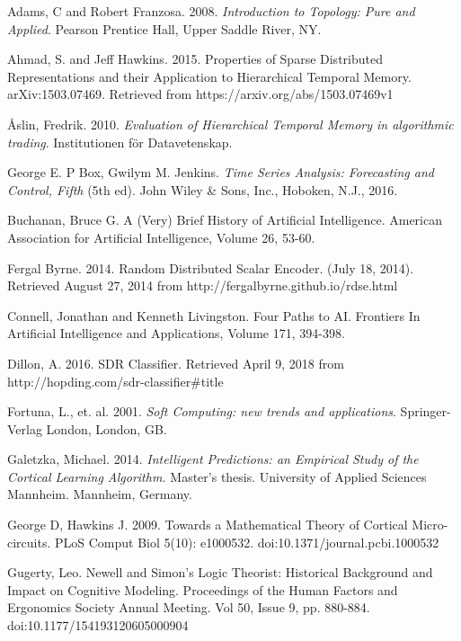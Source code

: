 \documentclass[fleqn,notitlepage,minimal]{article}
\begin{document}
	\begin{thebibliography}{99}
		
		 Adams, C and Robert Franzosa. 2008. \textit{Introduction to Topology: Pure and Applied}. Pearson Prentice Hall, Upper Saddle River, NY.
		
		 Ahmad, S. and Jeff Hawkins. 2015. Properties of Sparse Distributed Representations and their Application to Hierarchical Temporal Memory. arXiv:1503.07469. Retrieved from https://arxiv.org/abs/1503.07469v1
		
		 \r{A}slin, Fredrik. 2010. \textit{Evaluation of Hierarchical Temporal Memory in algorithmic trading}. Institutionen f\"{o}r Datavetenskap.
		
		 George E. P Box, Gwilym M. Jenkins. \emph{Time Series Analysis: Forecasting and Control, Fifth} (5th ed). John Wiley \& Sons, Inc., Hoboken, N.J., 2016.
		
		 Buchanan, Bruce G. A (Very) Brief History of Artificial Intelligence. American Association for Artificial Intelligence, Volume 26, 53-60.
		
		 Fergal Byrne. 2014. Random Distributed Scalar Encoder. (July 18, 2014). Retrieved August 27, 2014 from http://fergalbyrne.github.io/rdse.html
		
		 Connell, Jonathan and Kenneth Livingston. Four Paths to AI. Frontiers In Artificial Intelligence and Applications, Volume 171, 394-398.
		
		 Dillon, A. 2016. SDR Classifier. Retrieved April 9, 2018 from http://hopding.com/sdr-classifier\#title
		
		 Fortuna, L., et. al. 2001. \textit{Soft Computing: new trends and applications}. Springer-Verlag London, London, GB.
		
		 Galetzka, Michael. 2014. \emph{Intelligent Predictions: an Empirical Study of the Cortical Learning Algorithm.} Master's thesis. University of Applied Sciences Mannheim. Mannheim, Germany. 
		
		 George D, Hawkins J. 2009. Towards a Mathematical Theory of Cortical Micro-circuits. PLoS Comput Biol 5(10): e1000532. doi:10.1371/journal.pcbi.1000532 
		
		 Gugerty, Leo. Newell and Simon's Logic Theorist: Historical Background and Impact on Cognitive Modeling. Proceedings of the Human Factors and Ergonomics Society Annual Meeting. Vol 50, Issue 9, pp. 880-884.  doi:10.1177/154193120605000904
		

\end{thebibliography}
\end{document}
